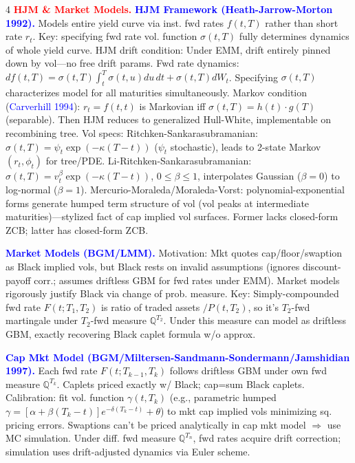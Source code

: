 \documentclass[landscape]{article}
\begin{document}
\begin{multicols}{4}
\textcolor{red}{\textbf{HJM \& Market Models.}}
\textcolor{blue}{\textbf{HJM Framework (Heath-Jarrow-Morton 1992).}} Models entire yield curve via inst. fwd rates $f(t,T)$ rather than short rate $r_t$. Key: specifying fwd rate vol. function $\sigma(t,T)$ fully determines dynamics of whole yield curve. HJM drift condition: Under EMM, drift entirely pinned down by vol—no free drift params. Fwd rate dynamics: $df(t,T)=\sigma(t,T)\int_t^T\sigma(t,u)du\,dt+\sigma(t,T)dW_t$. Specifying $\sigma(t,T)$ characterizes model for all maturities simultaneously. Markov condition (\textcolor{blue}{Carverhill 1994}): $r_t=f(t,t)$ is Markovian iff $\sigma(t,T)=h(t)\cdot g(T)$ (separable). Then HJM reduces to generalized Hull-White, implementable on recombining tree. Vol specs: Ritchken-Sankarasubramanian: $\sigma(t,T)=\psi_t\exp(-\kappa(T-t))$ ($\psi_t$ stochastic), leads to 2-state Markov $(r_t,\phi_t)$ for tree/PDE. Li-Ritchken-Sankarasubramanian: $\sigma(t,T)=v_t^\beta\exp(-\kappa(T-t))$, $0\leq\beta\leq 1$, interpolates Gaussian ($\beta=0$) to log-normal ($\beta=1$). Mercurio-Moraleda/Moraleda-Vorst: polynomial-exponential forms generate humped term structure of vol (vol peaks at intermediate maturities)—stylized fact of cap implied vol surfaces. Former lacks closed-form ZCB; latter has closed-form ZCB.

\textcolor{blue}{\textbf{Market Models (BGM/LMM).}} Motivation: Mkt quotes cap/floor/swaption as Black implied vols, but Black rests on invalid assumptions (ignores discount-payoff corr.; assumes driftless GBM for fwd rates under EMM). Market models rigorously justify Black via change of prob. measure. Key: Simply-compounded fwd rate $F(t;T_1,T_2)$ is ratio of traded assets $/P(t,T_2)$, so it's $T_2$-fwd martingale under $T_2$-fwd measure $\mathbb{Q}^{T_2}$. Under this measure can model as driftless GBM, exactly recovering Black caplet formula w/o approx.

\textcolor{blue}{\textbf{Cap Mkt Model (BGM/Miltersen-Sandmann-Sondermann/Jamshidian 1997).}} Each fwd rate $F(t;T_{k-1},T_k)$ follows driftless GBM under own fwd measure $\mathbb{Q}^{T_k}$. Caplets priced exactly w/ Black; cap=sum Black caplets. Calibration: fit vol. function $\gamma(t,T_k)$ (e.g., parametric humped $\gamma=[\alpha+\beta(T_k-t)]e^{-\delta(T_k-t)}+\theta$) to mkt cap implied vols minimizing sq. pricing errors. Swaptions can't be priced analytically in cap mkt model $\Rightarrow$ use MC simulation. Under diff. fwd measure $\mathbb{Q}^{T_n}$, fwd rates acquire drift correction; simulation uses drift-adjusted dynamics via Euler scheme.


\end{multicols}
\end{document}
